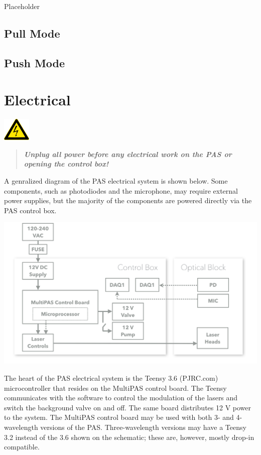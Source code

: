 \documentclass[]{book}
\begin{document}
Placeholder

\section{Pull Mode}\label{pull-mode}

\section{Push Mode}\label{push-mode}

\chapter{Electrical}\label{electrical}

\includegraphics[width=50px]{./images/warning_highVoltage}

\begin{quote}
\textbf{\emph{Unplug all power before any electrical work on the PAS or
opening the control box!}}
\end{quote}

A genralized diagram of the PAS electrical system is shown below. Some
components, such as photodiodes and the microphone, may require external
power supplies, but the majority of the components are powered directly
via the PAS control box.

\begin{center}\includegraphics{./images/electricalDiagram} \end{center}

The heart of the PAS electrical system is the Teensy 3.6 (PJRC.com)
microcontroller that resides on the MultiPAS control board. The Teensy
communicates with the software to control the modulation of the lasers
and switch the background valve on and off. The same board distributes
12 V power to the system. The MultiPAS control board may be used with
both 3- and 4-wavelength versions of the PAS. Three-wavelength versions
may have a Teensy 3.2 instead of the 3.6 shown on the schematic; these
are, however, mostly drop-in compatible.
\end{document}
